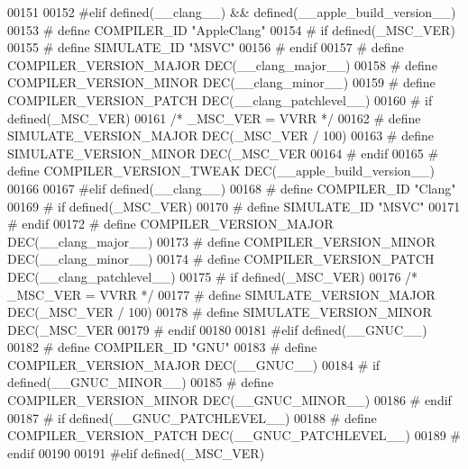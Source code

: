 \begin{DoxyCode}
{{{{{{{{{{{{{{{{{{{{{00151 
00152 \textcolor{preprocessor}{#elif defined(\_\_clang\_\_) && defined(\_\_apple\_build\_version\_\_)}
00153 \textcolor{preprocessor}{# define COMPILER\_ID "AppleClang"}
00154 \textcolor{preprocessor}{# if defined(\_MSC\_VER)}
00155 \textcolor{preprocessor}{#  define SIMULATE\_ID "MSVC"}
00156 \textcolor{preprocessor}{# endif}
00157 \textcolor{preprocessor}{# define COMPILER\_VERSION\_MAJOR DEC(\_\_clang\_major\_\_)}
00158 \textcolor{preprocessor}{# define COMPILER\_VERSION\_MINOR DEC(\_\_clang\_minor\_\_)}
00159 \textcolor{preprocessor}{# define COMPILER\_VERSION\_PATCH DEC(\_\_clang\_patchlevel\_\_)}
00160 \textcolor{preprocessor}{# if defined(\_MSC\_VER)}
00161    \textcolor{comment}{/* \_MSC\_VER = VVRR */}
00162 \textcolor{preprocessor}{#  define SIMULATE\_VERSION\_MAJOR DEC(\_MSC\_VER / 100)}
00163 \textcolor{preprocessor}{#  define SIMULATE\_VERSION\_MINOR DEC(\_MSC\_VER %
00164 \textcolor{preprocessor}{# endif}
00165 \textcolor{preprocessor}{# define COMPILER\_VERSION\_TWEAK DEC(\_\_apple\_build\_version\_\_)}
00166 
00167 \textcolor{preprocessor}{#elif defined(\_\_clang\_\_)}
00168 \textcolor{preprocessor}{# define COMPILER\_ID "Clang"}
00169 \textcolor{preprocessor}{# if defined(\_MSC\_VER)}
00170 \textcolor{preprocessor}{#  define SIMULATE\_ID "MSVC"}
00171 \textcolor{preprocessor}{# endif}
00172 \textcolor{preprocessor}{# define COMPILER\_VERSION\_MAJOR DEC(\_\_clang\_major\_\_)}
00173 \textcolor{preprocessor}{# define COMPILER\_VERSION\_MINOR DEC(\_\_clang\_minor\_\_)}
00174 \textcolor{preprocessor}{# define COMPILER\_VERSION\_PATCH DEC(\_\_clang\_patchlevel\_\_)}
00175 \textcolor{preprocessor}{# if defined(\_MSC\_VER)}
00176    \textcolor{comment}{/* \_MSC\_VER = VVRR */}
00177 \textcolor{preprocessor}{#  define SIMULATE\_VERSION\_MAJOR DEC(\_MSC\_VER / 100)}
00178 \textcolor{preprocessor}{#  define SIMULATE\_VERSION\_MINOR DEC(\_MSC\_VER %
00179 \textcolor{preprocessor}{# endif}
00180 
00181 \textcolor{preprocessor}{#elif defined(\_\_GNUC\_\_)}
00182 \textcolor{preprocessor}{# define COMPILER\_ID "GNU"}
00183 \textcolor{preprocessor}{# define COMPILER\_VERSION\_MAJOR DEC(\_\_GNUC\_\_)}
00184 \textcolor{preprocessor}{# if defined(\_\_GNUC\_MINOR\_\_)}
00185 \textcolor{preprocessor}{#  define COMPILER\_VERSION\_MINOR DEC(\_\_GNUC\_MINOR\_\_)}
00186 \textcolor{preprocessor}{# endif}
00187 \textcolor{preprocessor}{# if defined(\_\_GNUC\_PATCHLEVEL\_\_)}
00188 \textcolor{preprocessor}{#  define COMPILER\_VERSION\_PATCH DEC(\_\_GNUC\_PATCHLEVEL\_\_)}
00189 \textcolor{preprocessor}{# endif}
00190 
00191 \textcolor{preprocessor}{#elif defined(\_MSC\_VER)}
}}}}}}}}}}}}}}}}}}}}}}}
\end{DoxyCode}
